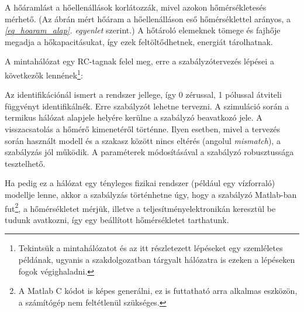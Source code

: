A hőáramlást a hőellenállások korlátozzák, mivel azokon hőmérsékletesés mérhető. (Az ábrán mért hőáram a hőellenálláson eső hőmérséklettel arányos, a \textit{\ref{eq_hoaram_alap}. egyenlet} szerint.) A hőtároló elemeknek tömege és fajhője megadja a hőkapacitásukat, így ezek feltöltődhetnek, energiát tárolhatnak.


A mintahálózat egy RC-tagnak felel meg, erre a szabályzótervezés lépései a következők lennének\footnote{Tekintsük a mintahálózatot és az itt részletezett lépéseket egy szemléletes példának, ugyanis a szakdolgozatban tárgyalt hálózatra is ezeken a lépéseken fogok végighaladni.}:

Az identifikációnál ismert a rendszer jellege, így 0 zérussal, 1 pólussal átviteli függvényt identifikálnék.
Erre szabályzót lehetne tervezni. A szimuláció során a termikus hálózat alapjele helyére kerülne a szabályzó beavatkozó jele. A visszacsatolás a hőmérő kimenetéről történne. Ilyen esetben, mivel a tervezés során használt modell és a  szakasz között nincs eltérés (angolul \textit{mismatch}), a szabályzás jól működik.
A paraméterek módosításával a szabályzó robusztussága tesztelhető.

Ha pedig ez a hálózat egy tényleges fizikai rendszer (például egy vízforraló) modellje lenne, akkor a szabályzás történhetne úgy, hogy a szabályzó Matlab-ban fut\footnote{A Matlab C kódot is képes generálni, ez is futtatható arra alkalmas eszközön, a számítógép nem feltétlenül szükséges.}, a hőmérsékletet mérjük, illetve a teljesítményelektronikán keresztül be tudunk avatkozni, így egy beállított hőmérsékletet tarthatunk.

